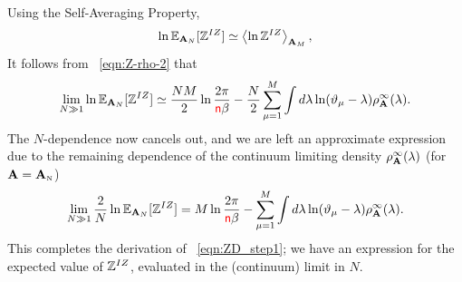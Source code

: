Using the Self-Averaging Property,
\begin{equation}
   \ln \EZDATWO \simeq \Expected[\mathbf{A}_M]{\ln \ZD} ,
\end{equation}
It follows from \EQN~\ref{eqn:Z-rho-2}
that
\begin{equation}
   \lim_{N\gg 1} \ln \EZDATWO
   \simeq \dfrac{N M}{2}\ln\dfrac{2\pi}{\ND\beta}
         -\dfrac{N}{2}\sum_{\mu=1}^{M}\int d\lambda\ln(\DeltaMu-\lambda)\rho^{\infty}_{\AMAT}(\lambda)  .
\end{equation}
%
The $N$-dependence now cancels out,
and we are left an approximate expression due to the remaining dependence of the continuum limiting density
$\rho^{\infty}_{\AMAT}(\lambda)$ (for $\AMAT=\AMATN$)
%
\begin{equation}
\label{eqn:ln-Z-Nlim2}
    \lim_{N \gg 1}\dfrac{2}{N}\ln \EZDATWO
    = M\ln\dfrac{2\pi}{\ND\beta}-\sum_{\mu=1}^{M}\int d\lambda\ln(\DeltaMu-\lambda)\rho^{\infty}_{\AMAT}(\lambda)  .
\end{equation}
This completes the derivation of \EQN~\ref{eqn:ZD_step1}; 
we have an expression for the expected value of $\ZD$,
evaluated in the \LargeN (continuum) limit in $N$.

